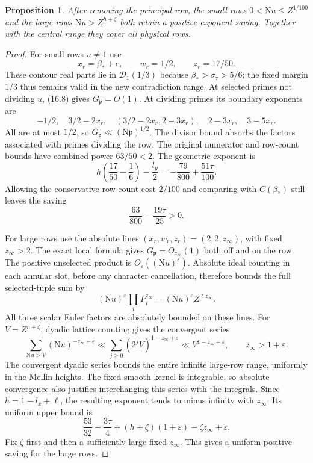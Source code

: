 \documentclass[10pt,reqno,a4paper]{amsart}
\newtheorem{proposition}[theorem]{Proposition}
\theoremstyle{remark}
\newcommand{\N}{\mathrm N}
\newcommand{\eps}{\varepsilon}
\newcommand{\pp}{\mathfrak p}
\newcommand{\st}{\sigma_\tau}
\newcommand{\bp}{\beta_*}
\begin{document}
\begin{proposition}\label{outer-rows}
After removing the principal row, the small rows
$0<\N u\le Z^{1/100}$ and the large rows
$\N u>Z^{h+\zeta}$ both retain a positive exponent saving.
Together with the central range they cover all physical rows.
\end{proposition}

\begin{proof}
For small rows $u\ne1$ use
\[
              x_r=\bp+e,\qquad w_r=1/2,\qquad z_r=17/50.
\]
These contour real parts lie in $\mathcal D_1(1/3)$ because $\bp>\st>5/6$;
the fixed margin $1/3$ thus remains valid in the new contradiction
range. At selected primes not dividing $u$, (16.8) gives
$G_\pp=O(1)$. At dividing primes its boundary exponents are
\[
 -1/2,\quad 3/2-2x_r,\quad
 (3/2-2x_r,2-3x_r),\quad 2-3x_r,\quad 3-5x_r.
\]
All are at most $1/2$, so $G_\pp\ll(\N\pp)^{1/2}$.
The divisor bound absorbs the factors associated with primes dividing
the row.
The original numerator and row-count bounds have combined power
$63/50<2$. The geometric exponent is
\[
 h\left(\frac{17}{50}-\frac16\right)-\frac{l_y}{2}
       =-\frac{79}{800}+\frac{51\tau}{100}.
\]
Allowing the conservative row-count cost $2/100$ and comparing
with $C(\bp)$ still leaves the saving
\[
                         \frac{63}{800}-\frac{19\tau}{25}>0.
\]

For large rows use the absolute lines
$(x_r,w_r,z_r)=(2,2,z_\infty)$, with fixed $z_\infty>2$.
The exact local formula gives $G_\pp=O_{z_\infty}(1)$ both off
and on the row. The positive unselected product is
$O_\eps((\N u)^\eps)$. Absolute ideal counting in each annular
slot, before any character cancellation, therefore bounds the full
selected-tuple sum by
\[
                 (\N u)^\eps\prod_iP_i^{z_\infty}
                       =(\N u)^\eps Z^{\ell z_\infty}.
\]
All three scalar Euler factors are absolutely bounded on these lines.
For $V=Z^{h+\zeta}$, dyadic lattice counting gives the convergent
series
\[
 \sum_{\N u>V}(\N u)^{-z_\infty+\eps}
 \ll\sum_{j\ge0}(2^jV)^{1-z_\infty+\eps}
 \ll V^{1-z_\infty+\eps},
 \qquad z_\infty>1+\eps.
\]
The convergent dyadic series bounds the entire infinite large-row
range, uniformly in the Mellin heights. The fixed smooth kernel is integrable,
so absolute convergence also justifies interchanging this series with
the integrals. Since $h=1-l_x+\ell$, the resulting exponent tends
to minus infinity with $z_\infty$. Its uniform upper bound is
\[
 \frac{53}{32}-\frac{3\tau}{4}
       +(h+\zeta)(1+\eps)-\zeta z_\infty+\eps.
\]
Fix $\zeta$ first and then a sufficiently large fixed
$z_\infty$. This gives a uniform positive saving for the large
rows.
\end{proof}
\end{document}
